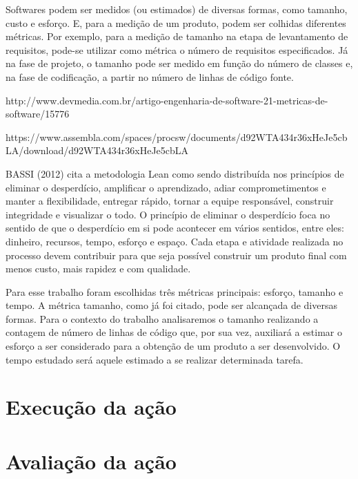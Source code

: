 		Softwares podem ser medidos (ou estimados) de diversas formas, como tamanho, custo e esforço. E, para a medição de um produto, podem ser colhidas diferentes métricas. Por exemplo, para a medição de tamanho na etapa de levantamento de requisitos, pode-se utilizar como métrica o número de requisitos especificados. Já na fase de projeto, o tamanho pode ser medido em função do número de classes e, na fase de codificação, a partir no número de linhas de código fonte.

		http://www.devmedia.com.br/artigo-engenharia-de-software-21-metricas-de-software/15776

		https://www.assembla.com/spaces/procsw/documents/d92WTA434r36xHeJe5cbLA/download/d92WTA434r36xHeJe5cbLA

		BASSI (2012) cita a metodologia Lean como sendo distribuída nos princípios de eliminar o desperdício, amplificar o aprendizado, adiar comprometimentos e manter a flexibilidade, entregar rápido, tornar a equipe responsável, construir integridade e visualizar o todo. O princípio de eliminar o desperdício foca no sentido de que o desperdício em si pode acontecer em vários sentidos, entre eles: dinheiro, recursos, tempo, esforço e espaço. Cada etapa e atividade realizada no processo devem contribuir para que seja possível construir um produto final com menos custo, mais rapidez e com qualidade.

		Para esse trabalho foram escolhidas três métricas principais: esforço, tamanho e tempo. A métrica tamanho, como já foi citado, pode ser alcançada de diversas formas. Para o contexto do trabalho analisaremos o tamanho realizando a contagem de número de linhas de código que, por sua vez, auxiliará a estimar o esforço a ser considerado para a obtenção de um produto a ser desenvolvido. O tempo estudado será aquele estimado a se realizar determinada tarefa.

	\section{Execução da ação}
	\section{Avaliação da ação}
